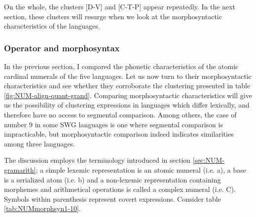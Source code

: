 On the whole, the  clusters  [D-V] and [C-T-P]  appear repeatedly.  In the next
section,  these clusters will resurge when we look at the morphosyntactic 
characteristics of the languages. 


\subsubsection{Operator and morphosyntax}
\label{sec:NUM-oper-morpho}


In the previous section, I compared   the phonetic characteristics of the
atomic cardinal numerals of the five languages.  Let us now turn to their
morphosyntactic characteristics and see whether they corroborate the clustering 
presented in table \ref{fig:NUM-align-quant-grand}.  Comparing morphosyntactic 
characteristics will give us the possibility of clustering expressions in
languages which differ lexically, and therefore have no access to segmental
comparison. Among others, the case of number 9 in some SWG languages is one
where segmental comparison is impracticable, but
morphosyntactic comparison indeed indicates similarities among three languages.

The discussion employs the terminology introduced in section
\ref{sec:NUM-gramarith};  a simple lexemic representation is an atomic numeral
(i.e. {\W a}),  a base is a serialized atom (i.e.  {\W b}) and  a non-lexemic
representation containing morphemes and arithmetical operations is called a
complex numeral (i.e.  {\W C}).  Symbols within parenthesis represent covert
expressions. Consider table \ref{tab:NUMmorphsyn1-10}.


